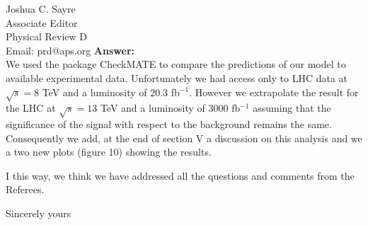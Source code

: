 \documentclass[10pt,a4paper]{letter}
\begin{document}
\begin{letter}{Joshua C. Sayre\\ 
			Associate Editor\\
			Physical Review D\\
			Email: prd@aps.org}
{\bf Answer:}\\
We used the package CheckMATE to compare the predictions of our model to available experimental data. Unfortunately we had access only to LHC data at $\sqrt{s}=8$ TeV and a luminosity of $20.3$ fb$^{-1}$. However we extrapolate the result for the LHC at $\sqrt{s}=13$ TeV and a luminosity of $3000$ fb$^{-1}$ assuming that the significance of the signal with respect to the background remains the same. Consequently we add, at the end of section V a discussion on this analysis and we a two new plots (figure 10)  showing the results.


I this way, we think we have addressed all the questions and comments from the Referees.




	
		\closing{Sincerely yours} 
	\end{letter} 
\end{document}
